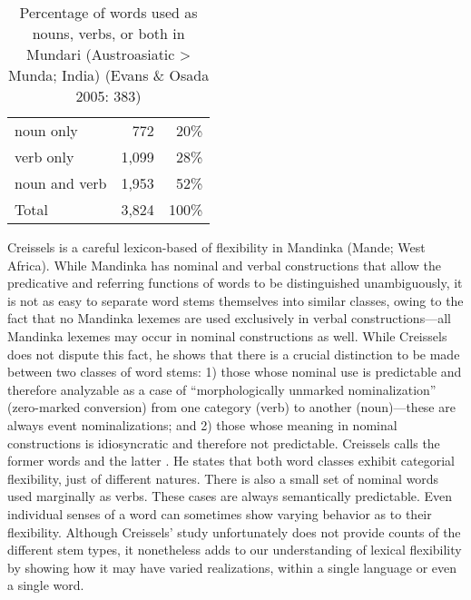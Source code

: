 \begin{table}[h]
  \centering
  \caption[Percentage of words used as nouns, verbs, or both in Mundari (Austroasiatic > Munda; India)]{Percentage of words used as nouns, verbs, or both in Mundari (Austroasiatic > Munda; India) (Evans \& Osada 2005: 383)}
  \label{tab:Evans-Osada-2005}
  \begin{tabular}{ l r r }
    \toprule
    noun only     &   772 &  20\% \\
    verb only     & 1,099 &  28\% \\
    noun and verb & 1,953 &  52\% \\
    \midrule
    Total         & 3,824 & 100\% \\
    \bottomrule
  \end{tabular}
\end{table}


Creissels  is a careful lexicon-based of flexibility in Mandinka (Mande; West Africa). While Mandinka has nominal and verbal constructions that allow the predicative and referring functions of words to be distinguished unambiguously, it is not as easy to separate word stems themselves into similar classes, owing to the fact that no Mandinka lexemes are used exclusively in verbal constructions—all Mandinka lexemes may occur in nominal constructions as well. While Creissels does not dispute this fact, he shows that there is a crucial distinction to be made between two classes of word stems: 1) those whose nominal use is predictable and therefore analyzable as a case of \enquote{morphologically unmarked nominalization} (zero-marked conversion) from one category (verb) to another (noun)—these are always event nominalizations; and 2) those whose meaning in nominal constructions is idiosyncratic and therefore not predictable. Creissels calls the former  words and the latter . He states that both word classes exhibit categorial flexibility, just of different natures. There is also a small set of nominal words used marginally as verbs. These cases are always semantically predictable. Even individual senses of a word can sometimes show varying behavior as to their flexibility. Although Creissels' study unfortunately does not provide counts of the different stem types, it nonetheless adds to our understanding of lexical flexibility by showing how it may have varied realizations, within a single language or even a single word.

